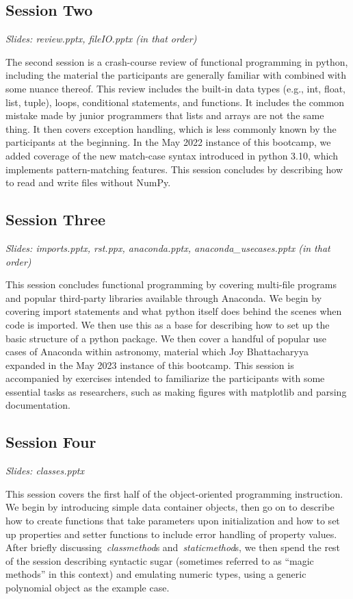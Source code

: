 \subsection{Session Two}
\label{sec:curriculum:two}
\noindent
\textit{Slides: review.pptx, fileIO.pptx (in that order)}
\par\noindent
The second session is a crash-course review of functional programming in
python, including the material the participants are generally familiar with
combined with some nuance thereof.
This review includes the built-in data types (e.g., int, float, list, tuple),
loops, conditional statements, and functions.
It includes the common mistake made by junior programmers that lists and arrays
are not the same thing.
It then covers exception handling, which is less commonly known by the
participants at the beginning.
In the May 2022 instance of this bootcamp, we added coverage of the new
match-case syntax introduced in python 3.10, which implements pattern-matching
features.
This session concludes by describing how to read and write files without NumPy.

\subsection{Session Three}
\label{sec:curriculum:three}
\noindent
\textit{Slides: imports.pptx, rst.ppx, anaconda.pptx, anaconda\_usecases.pptx
(in that order)}
\par\noindent
This session concludes functional programming by covering multi-file programs
and popular third-party libraries available through Anaconda.
We begin by covering import statements and what python itself does behind the
scenes when code is imported.
We then use this as a base for describing how to set up the basic structure of
a python package.
We then cover a handful of popular use cases of Anaconda within astronomy,
material which Joy Bhattacharyya expanded in the May 2023 instance of this
bootcamp.
This session is accompanied by exercises intended to familiarize the
participants with some essential tasks as researchers, such as making figures
with matplotlib and parsing documentation.

\subsection{Session Four}
\label{sec:curriculum:four}
\noindent
\textit{Slides: classes.pptx}
\par\noindent
This session covers the first half of the object-oriented programming
instruction.
We begin by introducing simple data container objects, then go on to describe
how to create functions that take parameters upon initialization and how to
set up properties and setter functions to include error handling of property
values.
After briefly discussing~\textit{classmethod}s and~\textit{staticmethod}s, we
then spend the rest of the session describing syntactic sugar (sometimes
referred to as ``magic methods'' in this context) and emulating numeric types,
using a generic polynomial object as the example case.

